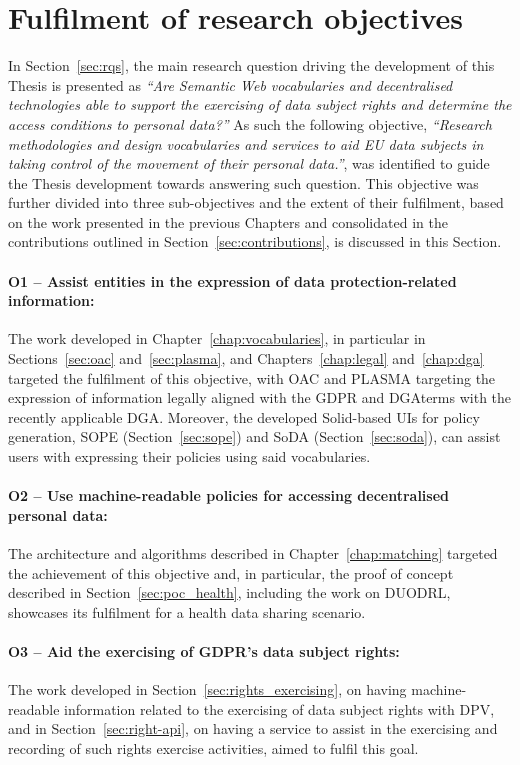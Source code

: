 \section{Fulfilment of research objectives}
\label{sec:fulfilment}

In Section~\ref{sec:rqs}, the main research question driving the development of this Thesis is presented as 
\textit{``Are Semantic Web vocabularies and decentralised technologies able to support the exercising of data subject rights and determine the access conditions to personal data?''}
As such the following objective,
\textit{``Research methodologies and design vocabularies and services to aid EU data subjects in taking control of the movement of their personal data.''},
was identified to guide the Thesis development towards answering such question.
This objective was further divided into three sub-objectives and the extent of their fulfilment, based on the work presented in the previous Chapters and consolidated in the contributions outlined in Section~\ref{sec:contributions}, is discussed in this Section.

\paragraph{O1 -- Assist entities in the expression of data protection-related information:} The work developed in Chapter~\ref{chap:vocabularies}, in particular in Sections~\ref{sec:oac} and~\ref{sec:plasma}, and Chapters~\ref{chap:legal} and~\ref{chap:dga} targeted the fulfilment of this objective, with OAC and PLASMA targeting the expression of information legally aligned with the GDPR and DGAterms with the recently applicable DGA. Moreover, the developed Solid-based UIs for policy generation, SOPE (Section~\ref{sec:sope}) and SoDA (Section~\ref{sec:soda}), can assist users with expressing their policies using said vocabularies.

\paragraph{O2 -- Use machine-readable policies for accessing decentralised personal data:} The architecture and algorithms described in Chapter~\ref{chap:matching} targeted the achievement of this objective and, in particular, the proof of concept described in Section~\ref{sec:poc_health}, including the work on DUODRL, showcases its fulfilment for a health data sharing scenario.

\paragraph{O3 -- Aid the exercising of GDPR’s data subject rights:} The work developed in Section~\ref{sec:rights_exercising}, on having machine-readable information related to the exercising of data subject rights with DPV, and in Section~\ref{sec:right-api}, on having a service to assist in the exercising and recording of such rights exercise activities, aimed to fulfil this goal. 


